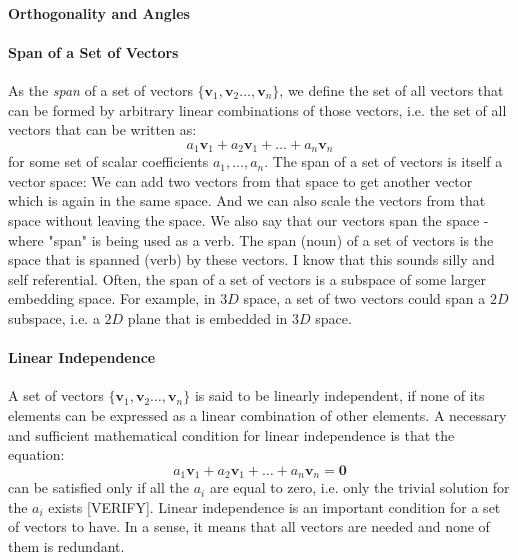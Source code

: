 \paragraph{Orthogonality and Angles}
% 


\paragraph{Span of a Set of Vectors}
As the \emph{span} of a set of vectors $\{\mathbf{v}_1, \mathbf{v}_2 \ldots, \mathbf{v}_n \}$, we define the set of all vectors that can be formed by arbitrary linear combinations of those vectors, i.e. the set of all vectors that can be written as:
\begin{equation}
 a_1 \mathbf{v}_1 + a_2 \mathbf{v}_1  + \ldots + a_n \mathbf{v}_n 
\end{equation}
for some set of scalar coefficients $a_1, \ldots, a_n$. The span of a set of vectors is itself a vector space: We can add two vectors from that space to get another vector which is again in the same space. And we can also scale the vectors from that space without leaving the space. We also say that our vectors span the space - where "span" is being used as a verb. The span (noun) of a set of vectors is the space that is spanned (verb) by these vectors. I know that this sounds silly and self referential. Often, the span of a set of vectors is a subspace of some larger embedding space. For example, in $3D$ space, a set of two vectors could span a $2D$ subspace, i.e. a $2D$ plane that is embedded in $3D$ space.


\paragraph{Linear Independence}
A set of vectors $\{\mathbf{v}_1, \mathbf{v}_2 \ldots, \mathbf{v}_n \}$ is said to be linearly independent, if none of its elements can be expressed as a linear combination of other elements. A necessary and sufficient mathematical condition for linear independence is that the equation:
\begin{equation}
 a_1 \mathbf{v}_1 + a_2 \mathbf{v}_1  + \ldots + a_n \mathbf{v}_n = \mathbf{0}
\end{equation}
can be satisfied only if all the $a_i$ are equal to zero, i.e. only the trivial solution for the $a_i$ exists [VERIFY]. Linear independence is an important condition for a set of vectors to have. In a sense, it means that all vectors are needed and none of them is redundant. 

